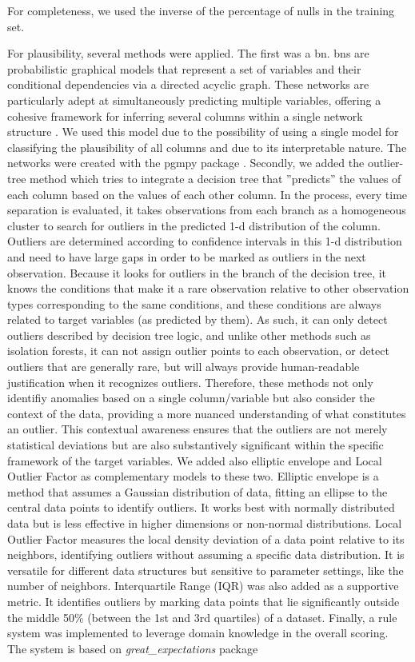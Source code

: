 For completeness, we used the inverse of the percentage of nulls in the training set. 

For plausibility, several methods were applied. The first was a \ac{bn}. \acp{bn} are probabilistic graphical models that represent a set of variables and their conditional dependencies via a directed acyclic graph. These networks are particularly adept at simultaneously predicting multiple variables, offering a cohesive framework for inferring several columns within a single network structure \cite{pearl1988probabilistic}.
We used this model due to the possibility of using a single model for classifying the plausibility of all columns and due to its interpretable nature. The networks were created with the pgmpy package \cite{pgmpy}. Secondly, we added the outlier-tree method \cite{cortesExplainableOutlierDetection2020} which tries to integrate a decision tree that ”predicts” the values of each column based on the values of each other column. In the process, every time separation is evaluated, it takes observations from each branch as a homogeneous cluster to search for outliers in the predicted 1-d distribution of the column. Outliers are determined according to confidence intervals in this 1-d distribution and need to have large gaps in order to be marked as outliers in the next observation. Because it looks for outliers in the branch of the decision tree, it knows the conditions that make it a rare observation relative to other observation types corresponding to the same conditions, and these conditions are always related to target variables (as predicted by them).  As such, it can only detect outliers described by decision tree logic, and unlike other methods such as isolation forests, it can not assign outlier points to each observation, or detect outliers that are generally rare, but will always provide human-readable justification when it recognizes outliers. Therefore, these methods not only identifiy anomalies based on a single column/variable but also consider the context of the data, providing a more nuanced understanding of what constitutes an outlier. This contextual awareness ensures that the outliers are not merely statistical deviations but are also substantively significant within the specific framework of the target variables. We added also elliptic envelope and Local Outlier Factor as complementary models to these two. Elliptic envelope is a method that assumes a Gaussian distribution of data, fitting an ellipse to the central data points to identify outliers. It works best with normally distributed data but is less effective in higher dimensions or non-normal distributions. Local Outlier Factor measures the local density deviation of a data point relative to its neighbors, identifying outliers without assuming a specific data distribution. It is versatile for different data structures but sensitive to parameter settings, like the number of neighbors. Interquartile Range (IQR) was also added as a supportive metric. It identifies outliers by marking data points that lie significantly outside the middle 50\% (between the 1st and 3rd quartiles) of a dataset. Finally, a rule system was implemented to leverage domain knowledge in the overall scoring. The system is based on \textit{great\_expectations} package 
